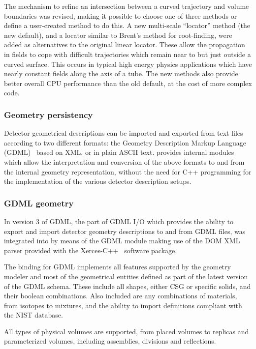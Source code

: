 The mechanism to refine an intersection between a curved trajectory and volume 
boundaries was revised, making it possible to choose one of three methods or 
define a user-created method to do this.  A new multi-scale ``locator'' method 
(the new default), and a locator similar to Brent's method \cite{detmodeling:Brent} 
for root-finding, were added as alternatives to the original linear locator.
These allow the propagation in fields to cope with difficult trajectories which 
remain near to but just outside a curved surface.  This occurs in typical high 
energy physics applications which have nearly constant fields along the axis of
a tube.  The new methods also provide better overall CPU performance than the
old default, at the cost of more complex code.   

\subsubsection{Geometry persistency}
Detector geometrical descriptions can be imported and exported from text files
according to two different formats: the Geometry Description Markup Language 
(GDML)~\cite{MT:GDML} based on XML, or in plain ASCII text.  \Gfour{} provides
internal modules which allow the interpretation and conversion of the above 
formats to and from the internal geometry representation, without the need for 
C++ programming for the implementation of the various detector description 
setups.

\subsubsection*{GDML geometry}

In version 3 of GDML, the part of GDML I/O which provides the ability to
export and import detector geometry descriptions to and from GDML files, was
integrated into \Gfour{} by means of the GDML module making use of the DOM
XML parser provided with the Xerces-C++~\cite{detmodeling:XercesC} software
package.

The \Gfour{} binding for GDML implements all features supported by the \Gfour{}
geometry modeler and most of the geometrical entities defined as part of the
latest version of the GDML schema. These include all shapes, either CSG or 
specific solids, and their boolean combinations.  Also included are any 
combinations of materials, from isotopes to mixtures, and the ability to import
definitions compliant with the \Gfour{} NIST database.

All types of physical volumes are supported, from placed volumes to replicas and
parameterized volumes, including assemblies, divisions and reflections.

